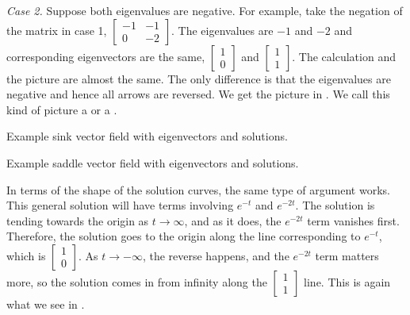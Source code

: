 \emph{Case 2.} Suppose both eigenvalues are negative.  For example, take
the
negation of the matrix in case 1,
$\left[ \begin{smallmatrix} -1 & -1 \\ 0 & -2 \end{smallmatrix} \right]$.
The eigenvalues are $-1$ and $-2$ and corresponding eigenvectors are
the same,
$\left[ \begin{smallmatrix} 1 \\ 0 \end{smallmatrix} \right]$ and
$\left[ \begin{smallmatrix} 1 \\ 1 \end{smallmatrix} \right]$.  The
calculation and the picture are almost the same.  The only difference is that
the eigenvalues are negative and hence all arrows are reversed.  We get the
picture in .  We call this kind of picture a
\emph{} or a \emph{}.

\begin{myfig}
\parbox[t]{3.0in}{
 \capstart
 \caption{Example sink vector field with eigenvectors and
 solutions.\label{pln:sink-fullfig}}
}
\quad
\parbox[t]{3.0in}{
 \capstart
 \caption{Example saddle vector field with eigenvectors and
 solutions.\label{pln:saddle-fullfig}}
}
\end{myfig}

In terms of the shape of the solution curves, the same type of argument works. This general solution will have terms involving $e^{-t}$ and $e^{-2t}$. The solution is tending towards the origin as $t \rightarrow \infty$, and as it does, the $e^{-2t}$ term vanishes first. Therefore, the solution goes to the origin along the line corresponding to $e^{-t}$, which is $\left[\begin{smallmatrix} 1 \\ 0 \end{smallmatrix}\right]$. As $t \rightarrow -\infty$, the reverse happens, and the $e^{-2t}$ term matters more, so the solution comes in from infinity along the $\left[\begin{smallmatrix} 1 \\ 1 \end{smallmatrix}\right]$ line. This is again what we see in . 

